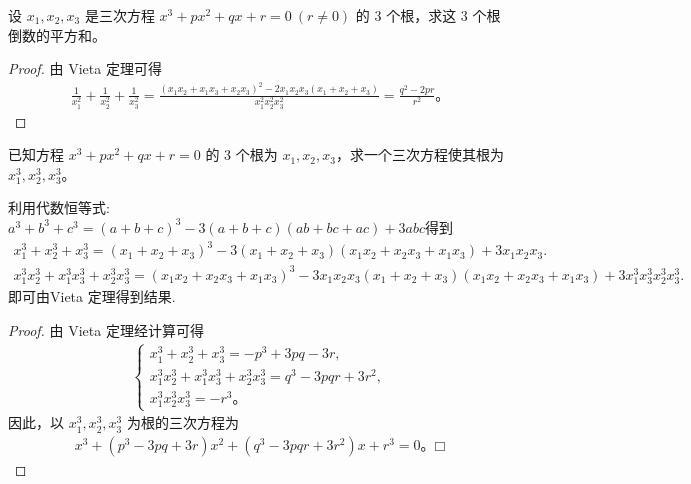 \documentclass[../../main.tex]{subfiles}%
\begin{document}
\begin{example}
设 $x_1, x_2, x_3$ 是三次方程 $x^3 + px^2 + qx + r = 0 \ (r \neq 0)$ 的 3 个根，求这 3 个根倒数的平方和。
\end{example}
\begin{proof}

由 Vieta 定理可得
\begin{align*}
\frac{1}{x_1^2} + \frac{1}{x_2^2} + \frac{1}{x_3^2} = \frac{(x_1 x_2 + x_1 x_3 + x_2 x_3)^2 - 2x_1 x_2 x_3 (x_1 + x_2 + x_3)}{x_1^2 x_2^2 x_3^2}= \frac{q^2 - 2pr}{r^2}。
\end{align*}

\end{proof}

\begin{example}
已知方程 $x^3 + px^2 + qx + r = 0$ 的 3 个根为 $x_1, x_2, x_3$，求一个三次方程使其根为 $x_1^3, x_2^3, x_3^3$。
\end{example}
\begin{note}
利用代数恒等式:$a^3+b^3+c^3=\left( a+b+c \right) ^3-3\left( a+b+c \right) \left( ab+bc+ac \right) +3abc$得到
\begin{gather*}
x_{1}^{3}+x_{2}^{3}+x_{3}^{3}=\left( x_1+x_2+x_3 \right) ^3-3\left( x_1+x_2+x_3 \right) \left( x_1x_2+x_2x_3+x_1x_3 \right) +3x_1x_2x_3.
\\
x_{1}^{3}x_{2}^{3}+x_{1}^{3}x_{3}^{3}+x_{2}^{3}x_{3}^{3}=\left( x_1x_2+x_2x_3+x_1x_3 \right) ^3-3x_1x_2x_3\left( x_1+x_2+x_3 \right) \left( x_1x_2+x_2x_3+x_1x_3 \right) +3x_{1}^{3}x_{3}^{3}x_{2}^{3}x_{3}^{3}.
\end{gather*}
即可由Vieta 定理得到结果.
\end{note}
\begin{proof}

由 Vieta 定理经计算可得
\begin{align*}
\begin{cases}
x_1^3 + x_2^3 + x_3^3 = -p^3 + 3pq - 3r, \\
x_1^3 x_2^3 + x_1^3 x_3^3 + x_2^3 x_3^3 = q^3 - 3pqr + 3r^2, \\
x_1^3 x_2^3 x_3^3 = -r^3。
\end{cases}
\end{align*}
因此，以 $x_1^3, x_2^3, x_3^3$ 为根的三次方程为
\begin{align*}
x^3 + (p^3 - 3pq + 3r)x^2 + (q^3 - 3pqr + 3r^2)x + r^3 = 0。□
\end{align*}

\end{proof}
\end{document}
